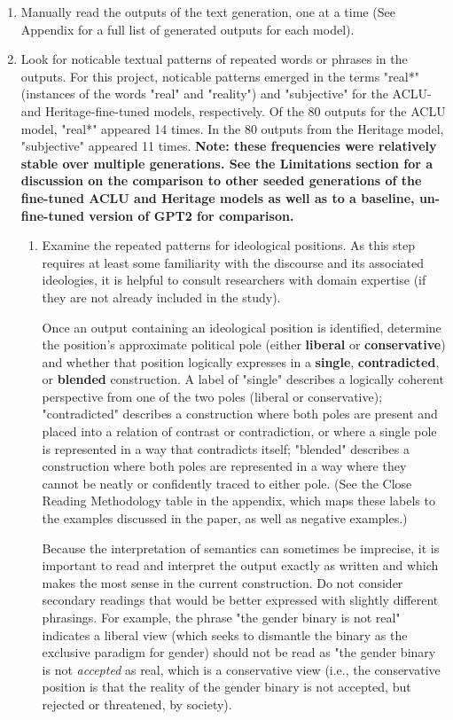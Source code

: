 \documentclass[11pt]{article}
\begin{document}
\begin{enumerate}
\item Manually read the outputs of the text generation, one at a time
(See Appendix for a full list of generated outputs for each model).

\item Look for noticable textual patterns of repeated words or phrases in
the outputs. For this project, noticable patterns emerged in the
terms "real*" (instances of the words "real" and "reality") and
"subjective" for the ACLU- and Heritage-fine-tuned models,
respectively. Of the 80 outputs for the ACLU model, "real*"
appeared 14 times. In the 80 outputs from the Heritage model,
"subjective" appeared 11 times. \textbf{Note: these frequencies were
relatively stable over multiple generations. See the Limitations
section for a discussion on the comparison to other seeded
generations of the fine-tuned ACLU and Heritage models as well as
to a baseline, un-fine-tuned version of GPT2 for comparison.}

\begin{enumerate}
\item Examine the repeated patterns for ideological positions. As this
step requires at least some familiarity with the discourse and its
associated ideologies, it is helpful to consult researchers with
domain expertise (if they are not already included in the study).

Once an output containing an ideological position is identified,
determine the position's approximate political pole (either
\textbf{\textbf{liberal}} or \textbf{\textbf{conservative}}) and whether that position
logically expresses in a \textbf{\textbf{single}}, \textbf{\textbf{contradicted}}, or
\textbf{\textbf{blended}} construction. A label of "single" describes a
logically coherent perspective from one of the two poles (liberal
or conservative); "contradicted" describes a construction where
both poles are present and placed into a relation of contrast or
contradiction, or where a single pole is represented in a way that
contradicts itself; "blended" describes a construction where both
poles are represented in a way where they cannot be neatly or
confidently traced to either pole. (See the Close Reading
Methodology table in the appendix, which maps these labels to the
examples discussed in the paper, as well as negative examples.)

Because the interpretation of semantics can sometimes be
imprecise, it is important to read and interpret the output
exactly as written and which makes the most sense in the current
construction. Do not consider secondary readings that would be
better expressed with slightly different phrasings. For example,
the phrase "the gender binary is not real" indicates a liberal
view (which seeks to dismantle the binary as the exclusive
paradigm for gender) should not be read as "the gender binary is
not \emph{accepted} as real, which is a conservative view (i.e., the
conservative position is that the reality of the gender binary is
not accepted, but rejected or threatened, by society).


\end{enumerate}
\end{enumerate}
\end{document}
